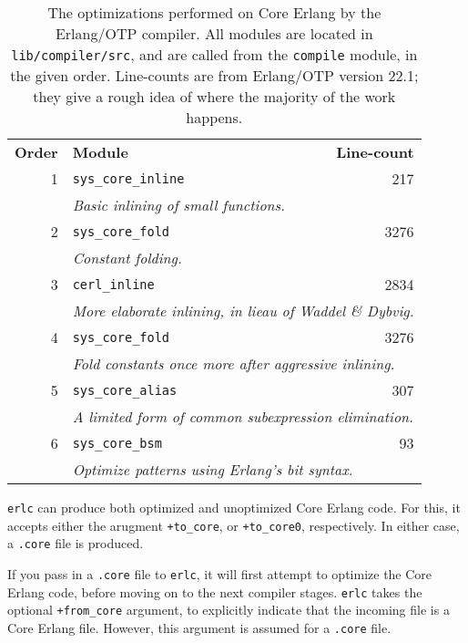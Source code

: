 \begin{table}[ht!]
\centering
\def\arraystretch{1.2}
\begin{tabular}{rlr}
\textbf{Order} & \textbf{Module} & \textbf{Line-count} \\\cline{2-3}
1 & \texttt{sys\_core\_inline} & 217 \\
  & \multicolumn{2}{l}{\quad\emph{%
      Basic inlining of small functions.%
    }} \\\cline{2-3}
2 & \texttt{sys\_core\_fold} & 3276 \\
  & \multicolumn{2}{l}{\quad\emph{%
      Constant folding.%
    }} \\\cline{2-3}
3 & \texttt{cerl\_inline} & 2834 \\
  & \multicolumn{2}{l}{\quad\emph{%
      More elaborate inlining, in lieau of Waddel \&
      Dybvig\cite{erlang:sas:1997:inlining}.%
    }} \\\cline{2-3}
4 & \texttt{sys\_core\_fold} & 3276 \\
  & \multicolumn{2}{l}{\quad\emph{%
      Fold constants once more after aggressive inlining.%
    }} \\\cline{2-3}
5 & \texttt{sys\_core\_alias} & 307 \\
  & \multicolumn{2}{l}{\quad\emph{%
      A limited form of common subexpression elimination.%
    }} \\\cline{2-3}
6 & \texttt{sys\_core\_bsm} & 93 \\
  & \multicolumn{2}{l}{\quad\emph{%
      Optimize patterns using Erlang's bit syntax.%
    }} \\\cline{2-3}

\end{tabular}
\caption{The optimizations performed on Core Erlang by the Erlang/OTP
compiler. All modules are located in \texttt{lib/compiler/src}, and
are called from the \texttt{compile} module, in the given order.
Line-counts are from Erlang/OTP version 22.1; they give  a rough idea
of where the majority of the work happens.}
\label{tbl:core-erlang-optimizations}
\end{table}

\texttt{erlc} can produce both optimized and unoptimized Core Erlang
code. For this, it accepts either the arugment \texttt{+to\_core}, or
\texttt{+to\_core0}, respectively. In either case, a \texttt{.core}
file is produced.

If you pass in a \texttt{.core} file to \texttt{erlc}, it will first
attempt to optimize the Core Erlang code, before moving on to the next
compiler stages. \texttt{erlc} takes the optional \texttt{+from\_core}
argument, to explicitly indicate that the incoming file is a Core
Erlang file. However, this argument is assumed for a \texttt{.core}
file.

